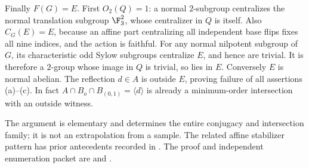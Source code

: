 Finally \(F(G)=E\).
First \(O_2(Q)=1\): a normal \(2\)-subgroup centralizes the normal
translation subgroup \(\F_3^2\), whose centralizer in \(Q\) is itself.
Also \(C_G(E)=E\), because an affine part centralizing all independent
base flips fixes all nine indices, and the action is faithful.
For any normal nilpotent subgroup of \(G\), its characteristic odd
Sylow subgroups centralize \(E\), and hence are trivial.
It is therefore a \(2\)-group whose image in \(Q\) is trivial,
so lies in \(E\). Conversely \(E\) is normal abelian.
The reflection \(d\in A\) is outside \(E\), proving failure of all
assertions (a)--(c). In fact
\(A\cap B_o\cap B_{(0,1)}=\langle d\rangle\) is already a
minimum-order intersection with an outside witness.

The argument is elementary and determines the entire conjugacy and
intersection family; it is not an extrapolation from a sample.
The related affine stabilizer pattern has prior antecedents recorded
in .
The proof and independent enumeration packet are
 and
.
